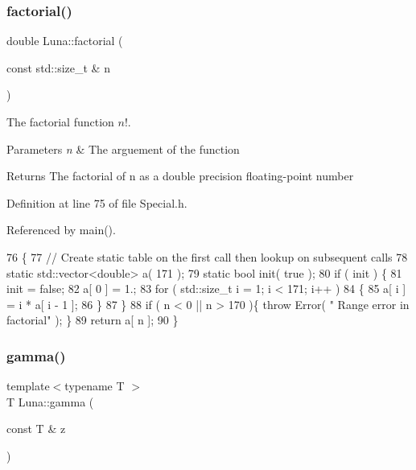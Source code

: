 \subsubsection{\texorpdfstring{factorial()}{factorial()}}
{\footnotesize\ttfamily double Luna\+::factorial (\begin{DoxyParamCaption}\item[{const std\+::size\+\_\+t \&}]{n }\end{DoxyParamCaption})}



The factorial function $ n! $. 


\begin{DoxyParams}{Parameters}
{\em n} & The arguement of the function \\
\hline
\end{DoxyParams}
\begin{DoxyReturn}{Returns}
The factorial of n as a double precision floating-\/point number 
\end{DoxyReturn}


Definition at line 75 of file Special.\+h.



Referenced by main().


\begin{DoxyCode}
76     \{
77       \textcolor{comment}{// Create static table on the first call then lookup on subsequent calls}
78       \textcolor{keyword}{static} std::vector<double> a( 171 );
79       \textcolor{keyword}{static} \textcolor{keywordtype}{bool} init( \textcolor{keyword}{true} );
80       \textcolor{keywordflow}{if} ( init ) \{
81         init = \textcolor{keyword}{false};
82         a[ 0 ] = 1.;
83         \textcolor{keywordflow}{for} ( std::size\_t i = 1; i < 171; i++ )
84         \{
85           a[ i ] = i * a[ i - 1 ];
86         \}
87       \}
88       \textcolor{keywordflow}{if} ( n < 0 || n > 170 )\{ \textcolor{keywordflow}{throw} Error( \textcolor{stringliteral}{" Range error in factorial"} ); \}
89       \textcolor{keywordflow}{return} a[ n ];
90     \}
\end{DoxyCode}
\mbox{\label{namespaceLuna_a4467788060a97debe131fa8f08a00de3}} 
\subsubsection{\texorpdfstring{gamma()}{gamma()}}
{\footnotesize\ttfamily template$<$typename T $>$ \\
T Luna\+::gamma (\begin{DoxyParamCaption}\item[{const T \&}]{z }\end{DoxyParamCaption})}




